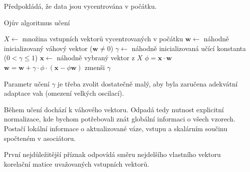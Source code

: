 \documentclass[11pt]{report} %
\renewcommand{\vec}[1]{\mathbf{#1}}
\numberwithin{equation}{section}
\begin{document}
Předpokládá, že data jsou vycentrována v počátku.

\bigskip
\begin{algorithm}[H]
\caption{Ojův algoritmus učení}
\begin{algorithmic}[1]
	\State $X \gets$  množina vstupních vektorů vycentrovaných v počátku
	\State $\vec{w} \gets$ náhodně inicializovaný váhový vektor ($\vec{w} \neq 0$)
	\State $\gamma \gets $ náhodně inicializovaná učící konstanta ($0 < \gamma \leq 1$)
		\State $\vec{x} \gets$ náhodně vybraný vektor z $X$
		\State $\phi = \vec{x}\cdot \vec{w}$
		\State $\vec{w} = \vec{w} + \gamma\cdot\phi\cdot(\vec{x} - \phi\vec{w})$
		\State zmenši $\gamma$
	\EndWhile
\end{algorithmic}
\end{algorithm}				

Parametr učení $\gamma$ je třeba zvolit dostatečně malý, aby byla zaručena adekvátní adaptace vah (omezení velkých oscilací).

Během učení dochází k  váhového vektoru. Odpadá tedy nutnost explicitní normalizace, kde bychom potřebovali znát globální informaci o všech vzorech. Postačí lokální informace o aktualizované váze, vstupu a skalárním součinu spočteném v asociátoru.

První nejdůležitější příznak odpovídá směru nejdelšího vlastního vektoru korelační matice uvažovaných vstupních vektorů.
\end{document}
